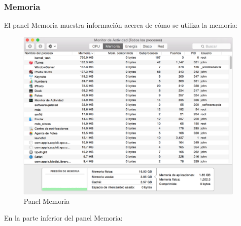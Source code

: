 \documentclass[a4paper,11pt]{article}
\begin{document}
\subsubsection{Memoria}

El panel Memoria muestra información acerca de cómo se utiliza la memoria:

\begin{figure}[H]
  \centering
  \includegraphics[width=1\textwidth]{02macActivityMonitorMemory}
  \caption{Panel Memoria}
  \label{fig:macActivityMonitorMemory}
\end{figure}

En la parte inferior del panel Memoria:
\end{document}
